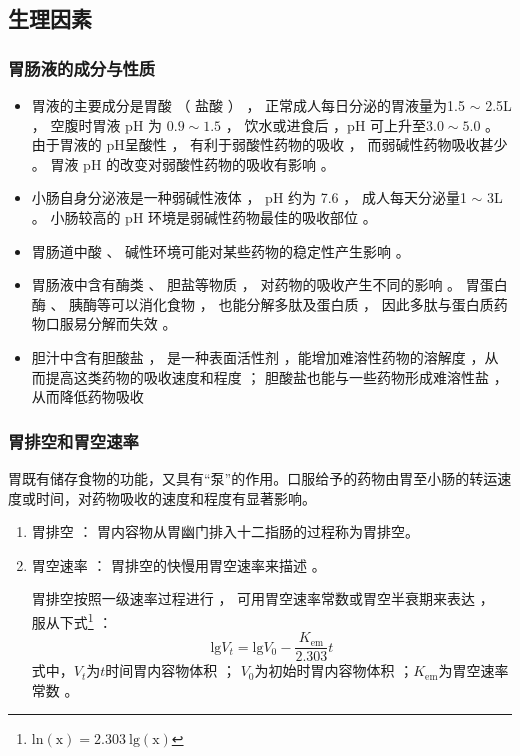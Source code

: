 \subsection{生理因素}


\begin{frame}
    \frametitle{胃肠液的成分与性质}
    \begin{itemize}
      \item 胃液的主要成分是胃酸 （ 盐酸 ） ， 正常成人每日分泌的胃液量为1.5 $\sim$ 2.5L ， 空腹时胃液 pH 为 $0.9\sim 1.5$  ， 饮水或进食后 ，pH 可上升至$3.0\sim 5.0$ 。 由于胃液的 pH呈酸性 ， 有利于弱酸性药物的吸收 ， 而弱碱性药物吸收甚少 。 胃液 pH 的改变对弱酸性药物的吸收有影响 。
      \item 小肠自身分泌液是一种弱碱性液体 ， pH 约为 7.6 ， 成人每天分泌量1 $\sim$ 3L 。 小肠较高的 pH 环境是弱碱性药物最佳的吸收部位 。 
      \item 胃肠道中酸 、 碱性环境可能对某些药物的稳定性产生影响 。
      \item 胃肠液中含有酶类 、 胆盐等物质 ， 对药物的吸收产生不同的影响 。 胃蛋白酶 、 胰酶等可以消化食物 ， 也能分解多肽及蛋白质 ， 因此多肽与蛋白质药物口服易分解而失效 。
      \item  胆汁中含有胆酸盐 ， 是一种表面活性剂 ，能增加难溶性药物的溶解度 ，从而提高这类药物的吸收速度和程度 ； 胆酸盐也能与一些药物形成难溶性盐 ， 从而降低药物吸收
    \end{itemize}
\end{frame}


\begin{frame}
    \frametitle{胃排空和胃空速率}
    胃既有储存食物的功能，又具有“泵”的作用。口服给予的药物由胃至小肠的转运速度或时间，对药物吸收的速度和程度有显著影响。

    \begin{enumerate}
      \item 胃排空 ： 胃内容物从胃幽门排入十二指肠的过程称为胃排空。
      \item 胃空速率 ： 胃排空的快慢用胃空速率来描述 。
      
      胃排空按照一级速率过程进行 ， 可用胃空速率常数或胃空半衰期来表达 ， 服从下式\footnote{$\mathrm{ln(x)=2.303}\ \mathrm{lg(x)}$} ：
      \[
        \mathrm{lg}V_{t}=\mathrm{lg}V_{0}-\frac{K_{\mathrm{em}}}{2.303}t
      \]
      式中，$V_t$为$t$时间胃内容物体积 ； $V_{0}$为初始时胃内容物体积 ；$K_{\mathrm{em}}$为胃空速率常数 。
    \end{enumerate}
    
    
\end{frame}


